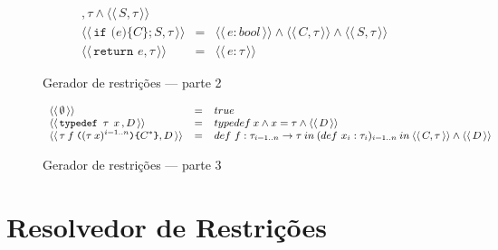 \documentclass[a4paper,8pt]{article}
\newcommand{\constr}[1]{\ensuremath{\langle\langle\,#1\,\rangle\rangle}}
\begin{document}
\begin{figure}[h]
\[{\begin{array}{lcl}
{                                                            , \tau}
                                                                \land \constr{S,\tau}\\
             \constr{\texttt{if (} e \texttt{)\{} C
             \texttt{\}} ; S , \tau} & = & \constr{e : bool}
                                                     \land
                                                     \constr{C
                                       , \tau} \land \constr{S,\tau}\\
             \constr{\texttt{return }e, \tau} & = & \constr{e : \tau}
           \end{array}}
       \]
       \caption{Gerador de restrições --- parte 2}
     \end{figure}

     \begin{figure}[h]
       \[
         \small{
           \begin{array}{lcl}
               \constr{\emptyset} & = & true \\
               \constr{\texttt{typedef }\tau\:\:x\,,D} & = &
                                                             typedef\:x\land
                                                             x = \tau
                                                             \land \constr{D}\\
               \constr{\tau\:f\:\texttt{(}(\tau\:x)^{i=1..n}\texttt{)}
             \texttt{\{}C^*\texttt{\}} , D} & = & def\,\,f :
                                                       \tau_{i =
                                                       1.. n}\to \tau
                                                       \:in\: 
                                                       (def\,\,x_i :
                                                       \tau_i)_{i
                                                       = 1..n}\: in\:
                                                       \constr{C,\tau}
                                                       \land \constr{D}
           \end{array}
         }
       \]
       \caption{Gerador de restrições --- parte 3}
     \end{figure}
     
     \section{Resolvedor de Restrições}\label{constraintsolver}
\end{document}
